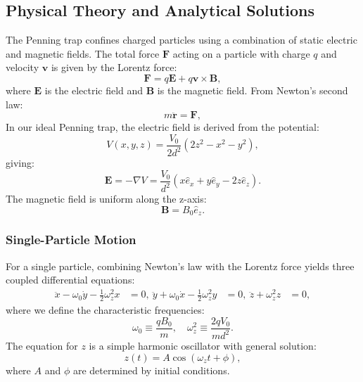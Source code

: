 \documentclass[english,notitlepage,reprint,nofootinbib]{revtex4-2}  %
\begin{document}
\subsection{Physical Theory and Analytical Solutions}
The Penning trap confines charged particles using a combination of static electric and magnetic fields. The total force $\mathbf{F}$ acting on a particle with charge $q$ and velocity $\mathbf{v}$ is given by the Lorentz force:
\begin{equation}
\mathbf{F} = q\mathbf{E} + q\mathbf{v}\times \mathbf{B},
\end{equation}
where $\mathbf{E}$ is the electric field and $\mathbf{B}$ is the magnetic field. From Newton's second law:
\begin{equation}
m\ddot{\mathbf{r}} = \mathbf{F},
\end{equation}
In our ideal Penning trap, the electric field is derived from the potential:
\begin{equation}
V(x, y, z) = \frac{V_0}{2d^2}(2z^2 - x^2 - y^2),
\end{equation}
giving:
\begin{equation}
\mathbf{E} = -\nabla V = \frac{V_0}{d^2}(x\hat{e}_x + y\hat{e}_y - 2z\hat{e}_z).
\end{equation}
The magnetic field is uniform along the z-axis:
\begin{equation}
\mathbf{B} = B_0\hat{e}_z.
\end{equation}
\subsubsection{Single-Particle Motion}
For a single particle, combining Newton's law with the Lorentz force yields three coupled differential equations:
\begin{align}
\ddot{x} - \omega_0 \dot{y} - \frac{1}{2}\omega_z^2 x &= 0, \
\ddot{y} + \omega_0 \dot{x} - \frac{1}{2}\omega_z^2 y &= 0, \
\ddot{z} + \omega_z^2 z &= 0,
\end{align}
where we define the characteristic frequencies:
\begin{equation}
\omega_0 \equiv \frac{qB_0}{m}, \quad \omega_z^2 \equiv \frac{2qV_0}{md^2}.
\end{equation}
The equation for $z$ is a simple harmonic oscillator with general solution:
\begin{equation}
z(t) = A\cos(\omega_z t + \phi),
\end{equation}
where $A$ and $\phi$ are determined by initial conditions.
\end{document}
